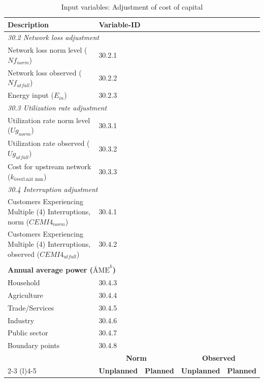 \begin{table}[H]
\centering
\footnotesize
\begin{threeparttable}
\caption{Input variables: Adjustment of cost of capital}
\label{tab:wacc-adj-variables}
\begin{tabular}{@{}p{8cm}cccc@{}}
\toprule
\textbf{Description} & \multicolumn{4}{l}{\textbf{Variable-ID}} \\
\midrule
\multicolumn{5}{l}{\textit{30.2 Network loss adjustment}} \\
Network loss norm level ($Nf_{norm}$) & \multicolumn{4}{l}{30.2.1} \\
Network loss observed ($Nf_{utfall}$) & \multicolumn{4}{l}{30.2.2} \\
Energy input ($E_{in}$) & \multicolumn{4}{l}{30.2.3} \\
\midrule
\multicolumn{5}{l}{\textit{30.3 Utilization rate adjustment}} \\
Utilization rate norm level ($Ug_{norm}$) & \multicolumn{4}{l}{30.3.1} \\
Utilization rate observed ($Ug_{utfall}$) & \multicolumn{4}{l}{30.3.2} \\
Cost for upstream network ($k_{\text{överl.nät mm}}$) & \multicolumn{4}{l}{30.3.3} \\
\midrule
\multicolumn{5}{l}{\textit{30.4 Interruption adjustment}} \\
Customers Experiencing Multiple (4) Interruptions, norm ($CEMI4_{norm}$) & \multicolumn{4}{l}{30.4.1} \\
Customers Experiencing Multiple (4) Interruptions, observed ($CEMI4_{utfall}$) & \multicolumn{4}{l}{30.4.2} \\
\\
\multicolumn{5}{l}{\textbf{Annual average power ($\text{ÅME}^k$)}} \\
Household & \multicolumn{4}{l}{30.4.3} \\
Agriculture & \multicolumn{4}{l}{30.4.4} \\
Trade/Services & \multicolumn{4}{l}{30.4.5} \\
Industry & \multicolumn{4}{l}{30.4.6} \\
Public sector & \multicolumn{4}{l}{30.4.7} \\
Boundary points & \multicolumn{4}{l}{30.4.8} \\
\midrule
& \multicolumn{2}{c}{\textbf{Norm}} & \multicolumn{2}{c}{\textbf{Observed}} \\
\cmidrule(lr){2-3} \cmidrule(l){4-5}
& \textbf{Unplanned} & \textbf{Planned} & \textbf{Unplanned} & \textbf{Planned} \\

\end{tabular}
\end{threeparttable}
\end{table}
